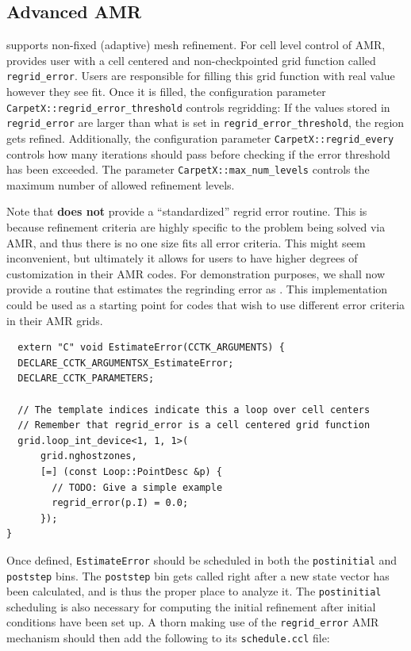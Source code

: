 \subsection{Advanced AMR}
\label{sec:advanced_amr}

\CarpetX\space supports non-fixed (adaptive) mesh refinement. For cell level control of AMR, \CarpetX\space provides user with a cell centered and non-checkpointed grid function called \texttt{regrid\_error}. Users are responsible for filling this grid function with real value however they see fit. Once it is filled, the configuration parameter \texttt{CarpetX::regrid\_error\_threshold} controls regridding: If the values stored in \texttt{regrid\_error} are larger than what is set in \texttt{regrid\_error\_threshold}, the region gets refined. Additionally, the configuration parameter \texttt{CarpetX::regrid\_every} controls how many iterations should pass before checking if the error threshold has been exceeded. The parameter \texttt{CarpetX::max\_num\_levels} controls the maximum number of allowed refinement levels.

Note that \CarpetX\space \textbf{does not} provide a ``standardized'' regrid error routine. This is because refinement criteria are highly specific to the problem being solved via AMR, and thus there is no one size fits all error criteria. This might seem inconvenient, but ultimately it allows for users to have higher degrees of customization in their AMR codes. For demonstration purposes, we shall now provide a routine that estimates the regrinding error as . This implementation could be used as a starting point for codes that wish to use different error criteria in their AMR grids.

\begin{lstlisting}
  extern "C" void EstimateError(CCTK_ARGUMENTS) {
  DECLARE_CCTK_ARGUMENTSX_EstimateError;
  DECLARE_CCTK_PARAMETERS;

  // The template indices indicate this a loop over cell centers
  // Remember that regrid_error is a cell centered grid function
  grid.loop_int_device<1, 1, 1>(
      grid.nghostzones,
      [=] (const Loop::PointDesc &p) {
        // TODO: Give a simple example
        regrid_error(p.I) = 0.0;
      });
}
\end{lstlisting}

Once defined, \texttt{EstimateError} should be scheduled in both the \texttt{postinitial} and \texttt{poststep} bins. The \texttt{poststep} bin gets called right after a new state vector has been calculated, and is thus the proper place to analyze it. The \texttt{postinitial} scheduling is also necessary for computing the initial refinement after initial conditions have been set up. A thorn making use of the \texttt{regrid\_error} AMR mechanism should then add the following to its \texttt{schedule.ccl} file:

